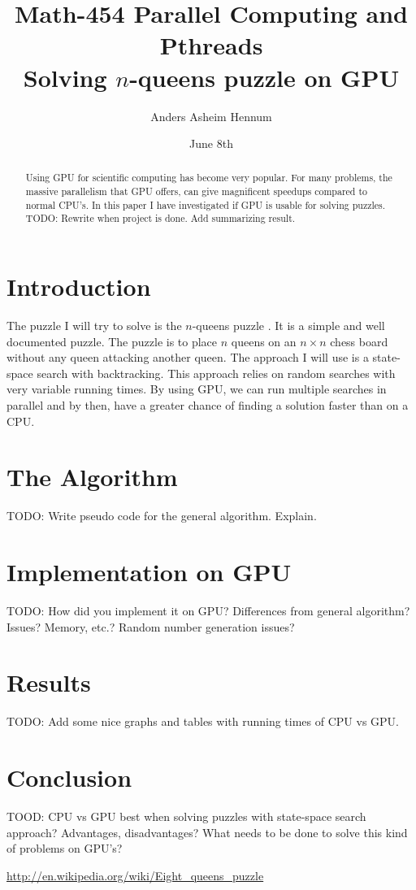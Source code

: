 \documentclass{article}
\title{Math-454 Parallel Computing and Pthreads \\
		Solving $n$-queens puzzle on GPU}
\author{Anders Asheim Hennum}
\date{June 8th}
\begin{document}
\maketitle

\begin{abstract}
Using GPU for scientific computing has become very popular. For many problems, 
the massive parallelism that GPU offers, can give magnificent speedups compared to 
normal CPU's. In this paper I have investigated if GPU is usable for solving puzzles. 
TODO: Rewrite when project is done. Add summarizing result.
\end{abstract}

\section{Introduction}

The puzzle I will try to solve is the $n$-queens puzzle \cite{nqueen}. It is a simple
and well documented puzzle. The puzzle is to place $n$ queens on an $n \times n$ chess
board without any queen attacking another queen. The approach I will use is a state-space
search with backtracking. This approach relies on random searches with very variable running times.
By using GPU, we can run multiple searches in parallel and by then, have a greater chance of finding
a solution faster than on a CPU. 

\section{The Algorithm}

TODO: Write pseudo code for the general algorithm. Explain.

\section{Implementation on GPU}

TODO: How did you implement it on GPU? Differences from general algorithm? Issues?
Memory, etc.? Random number generation issues?

\section{Results}

TODO: Add some nice graphs and tables with running times of CPU vs GPU.

\section{Conclusion}

TOOD: CPU vs GPU best when solving puzzles with state-space search approach? Advantages, 
disadvantages? What needs to be done to solve this kind of problems on GPU's?

\begin{thebibliography}{9}

	\url{http://en.wikipedia.org/wiki/Eight_queens_puzzle}

\end{thebibliography} 
\end{document}
